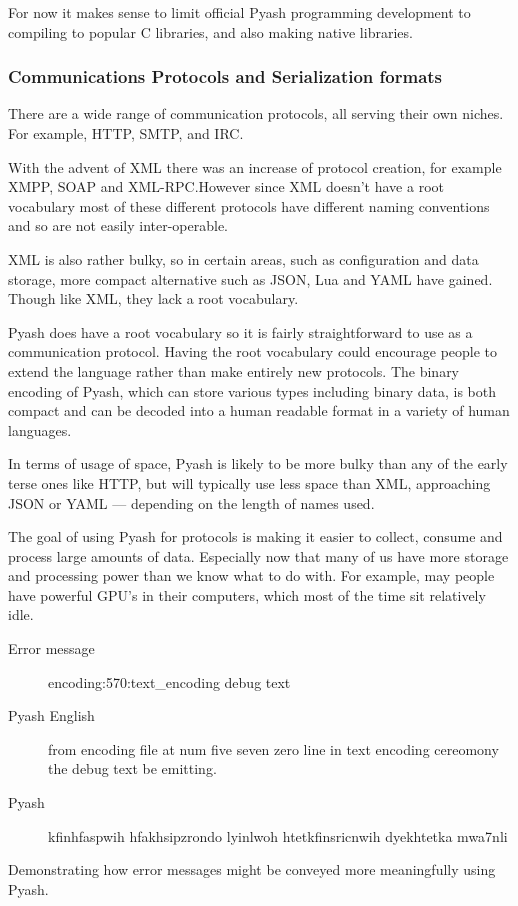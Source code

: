 For now it makes sense to limit official Pyash programming development to 
compiling to popular C libraries, and also making native libraries.

\subsubsection{Communications Protocols and Serialization formats}
There are a wide range of communication protocols, all serving their own niches.
For example, HTTP, SMTP, and IRC.\@  

With the advent of XML there was an increase of protocol creation, for example
XMPP, SOAP and XML-RPC.\@ However since
XML doesn't have a root vocabulary most of these different protocols have
different naming conventions and so are not easily inter-operable. 

XML is also rather bulky, so in certain areas, such as configuration and data
storage, more compact alternative such as JSON, Lua and YAML have gained.  
Though like XML, they lack a root vocabulary. 

Pyash does have a root vocabulary so it is fairly straightforward to use as a
communication protocol. Having the root vocabulary could encourage people to
extend the language rather than make entirely new protocols. The binary 
encoding of Pyash, which can store various types including binary data, 
is both compact and can be decoded into a human readable format in a variety of
human languages. 

In terms of usage of space, Pyash is likely to be more bulky than any of the 
early terse ones like HTTP, but will typically use less space than XML, 
approaching JSON or YAML --- depending on the length of names used. 

The goal of using Pyash for protocols is making it easier to collect, 
consume and process large amounts of data.
Especially now that many of us have more storage and processing power than we know what to
do with. For example, may people have powerful GPU's in their computers, which
most of the time sit relatively idle. 

\begin{table}
  \begin{description}
    \item[Error message]  encoding:570:text\_encoding debug text
    \item[Pyash English] from encoding file at num five seven zero line in text encoding
      cereomony the debug text be emitting.
    \item[Pyash] kfinhfaspwih hfakhsipzrondo lyinlwoh htetkfinsricnwih
      dyekhtetka mwa7nli
  \end{description}
  \caption{Demonstrating how error messages might be conveyed more meaningfully
  using Pyash. }\label{errorMessage}
\end{table}

